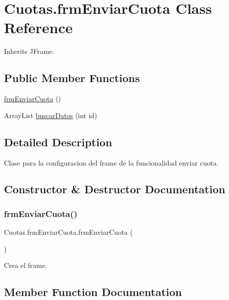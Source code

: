 \hypertarget{class_cuotas_1_1frm_enviar_cuota}{}\section{Cuotas.\+frm\+Enviar\+Cuota Class Reference}
\label{class_cuotas_1_1frm_enviar_cuota}


Inherits J\+Frame.

\subsection*{Public Member Functions}
\begin{DoxyCompactItemize}
\item 
\hyperlink{class_cuotas_1_1frm_enviar_cuota_aa56fbae4c49480798ea10a668a63787b}{frm\+Enviar\+Cuota} ()
\item 
Array\+List \hyperlink{class_cuotas_1_1frm_enviar_cuota_a283ee2fae2756ede7494a708903df16e}{buscar\+Datos} (int id)
\end{DoxyCompactItemize}


\subsection{Detailed Description}
Clase para la configuracion del frame de la funcionalidad enviar cuota. 

\subsection{Constructor \& Destructor Documentation}
\mbox{\label{class_cuotas_1_1frm_enviar_cuota_aa56fbae4c49480798ea10a668a63787b}} 
\subsubsection{\texorpdfstring{frm\+Enviar\+Cuota()}{frmEnviarCuota()}}
{\footnotesize\ttfamily Cuotas.\+frm\+Enviar\+Cuota.\+frm\+Enviar\+Cuota (\begin{DoxyParamCaption}{ }\end{DoxyParamCaption})}

Crea el frame. 

\subsection{Member Function Documentation}
\mbox{\label{class_cuotas_1_1frm_enviar_cuota_a283ee2fae2756ede7494a708903df16e}} 
